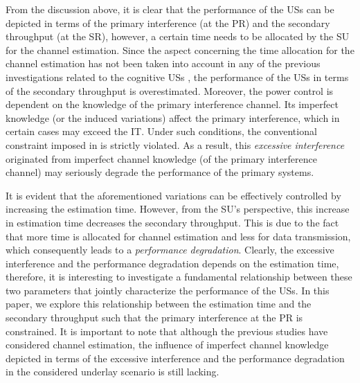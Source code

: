 From the discussion above, it is clear that the performance of the USs can be depicted in terms of the primary interference (at the PR) and the secondary throughput (at the SR), however, a certain time needs to be allocated by the SU for the channel estimation. Since the aspect concerning the time allocation for the channel estimation has not been taken into account in any of the previous investigations related to the cognitive USs \cite{Musa09, Suraweera10, Kim12}, the performance of the USs in terms of the secondary throughput is overestimated. Moreover, the power control is dependent on the knowledge of the primary interference channel. Its imperfect knowledge (or the induced variations) affect the primary interference, which in certain cases may exceed the IT. Under such conditions, the conventional constraint imposed in \cite{Xing07, Ghasemi07, Kang09} is strictly violated. As a result, this \textit{excessive interference} originated from imperfect channel knowledge (of the primary interference channel) may seriously degrade the performance of the primary systems. 

It is evident that the aforementioned variations can be effectively controlled by increasing the estimation time. However, from the SU's perspective, this increase in estimation time decreases the secondary throughput. This is due to the fact that more time is allocated for channel estimation and less for data transmission, which consequently leads to a \textit{performance degradation}. 
Clearly, the excessive interference and the performance degradation depends on the estimation time, therefore, it is interesting to investigate a fundamental relationship between these two parameters that jointly characterize the performance of the USs. %
  In this paper, we explore this relationship between the estimation time and the secondary throughput such that the primary interference at the PR is constrained. It is important to note that although the previous studies \cite{Musa09, Suraweera10, Kim12} have considered channel estimation, the influence of imperfect channel knowledge depicted in terms of the excessive interference and the performance degradation in the considered underlay scenario is still lacking. 
 
